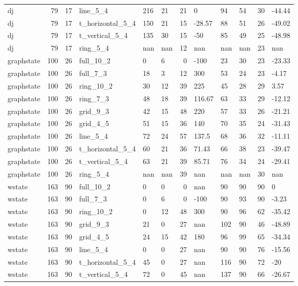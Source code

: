 \begin{longtable}{lrrlllrlllrl}
dj & 79 & 17 & line\_5\_4 & 216 & 21 & 21 & 0 & 94 & 54 & 30 & -44.44 \\
dj & 79 & 17 & t\_horizontal\_5\_4 & 150 & 21 & 15 & -28.57 & 88 & 51 & 26 & -49.02 \\
dj & 79 & 17 & t\_vertical\_5\_4 & 135 & 30 & 15 & -50 & 85 & 49 & 25 & -48.98 \\
dj & 79 & 17 & ring\_5\_4 & nan & nan & 12 & nan & nan & nan & 23 & nan \\
graphstate & 100 & 26 & full\_10\_2 & 0 & 6 & 0 & -100 & 23 & 30 & 23 & -23.33 \\
graphstate & 100 & 26 & full\_7\_3 & 18 & 3 & 12 & 300 & 53 & 24 & 23 & -4.17 \\
graphstate & 100 & 26 & ring\_10\_2 & 30 & 12 & 39 & 225 & 45 & 28 & 29 & 3.57 \\
graphstate & 100 & 26 & ring\_7\_3 & 48 & 18 & 39 & 116.67 & 63 & 33 & 29 & -12.12 \\
graphstate & 100 & 26 & grid\_9\_3 & 42 & 15 & 48 & 220 & 57 & 33 & 26 & -21.21 \\
graphstate & 100 & 26 & grid\_4\_5 & 51 & 15 & 36 & 140 & 70 & 35 & 24 & -31.43 \\
graphstate & 100 & 26 & line\_5\_4 & 72 & 24 & 57 & 137.5 & 68 & 36 & 32 & -11.11 \\
graphstate & 100 & 26 & t\_horizontal\_5\_4 & 60 & 21 & 36 & 71.43 & 66 & 38 & 23 & -39.47 \\
graphstate & 100 & 26 & t\_vertical\_5\_4 & 63 & 21 & 39 & 85.71 & 76 & 34 & 24 & -29.41 \\
graphstate & 100 & 26 & ring\_5\_4 & nan & nan & 39 & nan & nan & nan & 30 & nan \\
wstate & 163 & 90 & full\_10\_2 & 0 & 0 & 0 & nan & 90 & 90 & 90 & 0 \\
wstate & 163 & 90 & full\_7\_3 & 0 & 6 & 0 & -100 & 90 & 93 & 90 & -3.23 \\
wstate & 163 & 90 & ring\_10\_2 & 0 & 12 & 48 & 300 & 90 & 96 & 62 & -35.42 \\
wstate & 163 & 90 & grid\_9\_3 & 21 & 0 & 27 & nan & 102 & 90 & 46 & -48.89 \\
wstate & 163 & 90 & grid\_4\_5 & 24 & 15 & 42 & 180 & 96 & 99 & 65 & -34.34 \\
wstate & 163 & 90 & line\_5\_4 & 0 & 0 & 27 & nan & 90 & 90 & 76 & -15.56 \\
wstate & 163 & 90 & t\_horizontal\_5\_4 & 45 & 0 & 27 & nan & 116 & 90 & 72 & -20 \\
wstate & 163 & 90 & t\_vertical\_5\_4 & 72 & 0 & 45 & nan & 137 & 90 & 66 & -26.67 \\

\end{longtable}
